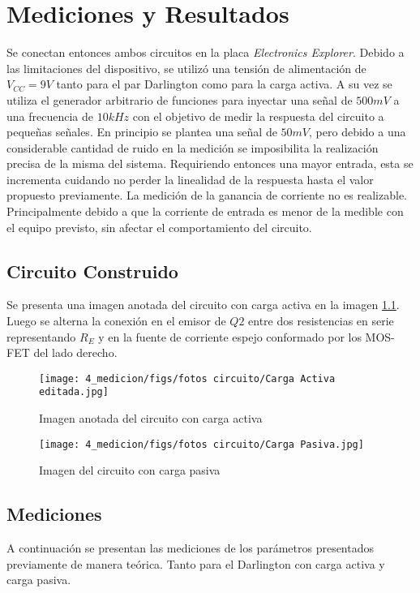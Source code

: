 \chapter{Mediciones y Resultados}
Se conectan entonces ambos circuitos en la placa \textit{Electronics Explorer}. Debido a las limitaciones del dispositivo, se utilizó una tensión de alimentación de $V_{CC} = 9V$ tanto para el par Darlington como para la carga activa.
A su vez se utiliza el generador arbitrario de funciones para inyectar una señal de $500 mV$ a una frecuencia de $10kHz$ con el objetivo de medir la respuesta del circuito a pequeñas señales. En principio se plantea una señal de $50 mV$, pero debido a una considerable cantidad de ruido en la medición se imposibilita la realización precisa de la misma del sistema.
Requiriendo entonces una mayor entrada, esta se incrementa cuidando no perder la linealidad de la respuesta hasta el valor propuesto previamente.
La medición de la ganancia de corriente no es realizable. Principalmente debido a que la corriente de entrada es menor de la medible con el equipo previsto, sin afectar el comportamiento del circuito.

\section{Circuito Construido}
Se presenta una imagen anotada del circuito con carga activa en la imagen \ref{fig: foto circuito carga activa}. Luego se alterna la conexión en el emisor de $Q2$ entre dos resistencias en serie representando $R_E$ y en la fuente de corriente espejo conformado por los MOS-FET del lado derecho. 

\begin{figure}[ht]
    \centering
    \texttt{[image: 4\_medicion/figs/fotos circuito/Carga Activa editada.jpg]}
    \caption{Imagen anotada del circuito con carga activa}\label{fig: foto circuito carga activa}
\end{figure}

\begin{figure}[ht]
    \centering
    \texttt{[image: 4\_medicion/figs/fotos circuito/Carga Pasiva.jpg]}
    \caption{Imagen del circuito con carga pasiva}\label{fig: foto circuito carga pasiva}
\end{figure}


\section{Mediciones}
A continuación se presentan las mediciones de los parámetros presentados previamente de manera teórica. Tanto para el Darlington con carga activa y carga pasiva.


